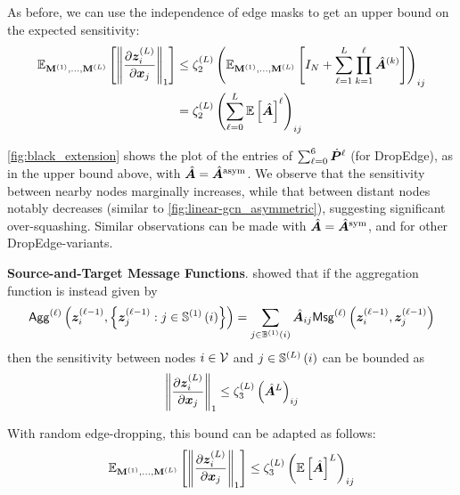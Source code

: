 As before, we can use the independence of edge masks to get an upper bound on the expected sensitivity:
\begin{align}
    \mathbb{E}_{\mathbf{M}^{\left(1\right)}, \ldots, \mathbf{M}^{\left(L\right)}} \left[\left\|\frac{\partial \bm{z}^{\left(L\right)}_i}{\partial \bm{x}_j}\right\|_1\right]
    &\leq
    \zeta_2^{\left(L\right)} \left(\mathbb{E}_{\mathbf{M}^{\left(1\right)}, \ldots, \mathbf{M}^{\left(L\right)}} \left[I_N + \sum_{\ell=1}^L \prod_{k=1}^{\ell} \hat{\bm{A}}^{\left(k\right)}\right]\right)_{ij} \\
    &=
    \zeta_2^{\left(L\right)} \left(\sum_{\ell=0}^L \mathbb{E} \left[\hat{\bm{A}}\right]^{\ell}\right)_{ij}
\end{align}

\autoref{fig:black_extension} shows the plot of the entries of $\sum_{\ell=0}^6 \dot{\bm{P}}^{\ell}$ (\ie for DropEdge), as in the upper bound above, with $\hat{\bm{A}} = \hat{\bm{A}}^{\text{asym}}$. %
We observe that the sensitivity between nearby nodes marginally increases, while that between distant nodes notably decreases (similar to \autoref{fig:linear-gcn_asymmetric}), suggesting significant over-squashing. Similar observations can be made with $\hat{\bm{A}} = \hat{\bm{A}}^{\text{sym}}$, and for other DropEdge-variants.

\textbf{Source-and-Target Message Functions}. \citet[Lemma 1]{topping2022understanding} showed that %
if the aggregation function is instead given by 
\begin{align}
    \mathsf{Agg}^{\left(\ell\right)} \left(\bm{z}_i^{\left(\ell-1\right)}, \left\{\bm{z}_j^{\left(\ell-1\right)}: j\in\mathbb{S}^{\left(1\right)}\left(i\right)\right\}\right) =
    \sum_{j\in\mathbb{B}^{\left(1\right)}\left(i\right)} \hat{\bm{A}}_{ij} \mathsf{Msg}^{\left(\ell\right)} \left(\bm{z}_i^{\left(\ell-1\right)}, \bm{z}_j^{\left(\ell-1\right)}\right)    
\end{align}
then the sensitivity between nodes $i\in\mathcal{V}$ and $j\in \mathbb{S}^{\left(L\right)}\left(i\right)$ can be bounded as
\begin{align}
    \left\|\frac{\partial \bm{z}^{\left(L\right)}_i}{\partial \bm{x}_j}\right\|_1 \leq \zeta_3^{\left(L\right)} \left(\hat{\bm{A}}^{L}\right)_{ij}
\end{align}

With random edge-dropping, this bound can be adapted as follows: %
\begin{align}
    \mathbb{E}_{\mathbf{M}^{\left(1\right)}, \ldots, \mathbf{M}^{\left(L\right)}} \left[\left\|\frac{\partial \bm{z}^{\left(L\right)}_i}{\partial \bm{x}_j}\right\|_1\right]
    \leq
    \zeta_3^{\left(L\right)} \left(\mathbb{E}\left[\hat{\bm{A}}\right]^{L}\right)_{ij}
\end{align}

